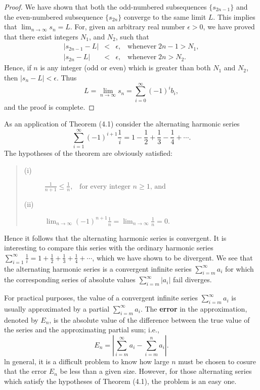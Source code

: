 \begin{proof}
We have shown that both the odd-numbered subsequences $\{s_{2n-1} \}$ and the even-numbered subsequence $\{ s_{2n} \}$ converge to the same limit $L$. This implies that $\lim_{n \rightarrow \infty} s_n = L$. For, given an arbitrary real number $ \epsilon > 0$, we have proved that there exist integers $N_1$, and $N_2$, such that
\begin{eqnarray*}
|s_{2n-1} - L| &<& \epsilon, \;\;\;\mbox{whenever}\; 2n - 1 > N_1, \\
|s_{2n} -L| &<& \epsilon,     \;\;\;\mbox{whenever}\; 2n > N_2. 
\end{eqnarray*}
Hence, if $n$ is any integer (odd or even) which is greater than both $N_1$ and $N_2$, then $|s_n - L| < \epsilon$. Thus
$$
L = \lim_{n \rightarrow \infty} s_n = \sum_{i=0}^\infty (-1)^{i} b_i,
$$
and the proof is complete.
\end{proof}

As an application of Theorem (4.1) consider the alternating harmonic series
$$
\sum_{ i=1}^\infty (-1)^{i + 1} \frac{1}{i} = 1 - \frac{1}{2} + \frac{1}{3} - \frac{1}{4} + \cdots .
$$
\noindent The hypotheses of the theorem are obviously satisfied:
 
\begin{quote}
\begin{description}
\item[(i)] $\frac{1}{n + 1} \leq \frac{1}{n}, \;\;\; \mbox{for every integer $n \geq 1$, and}$ 
\item[(ii)] $\lim_{n \rightarrow \infty} (-1)^{n+1} \frac{1}{n} = \lim_{n \rightarrow \infty} \frac{1}{n} = 0.$ 

\end{description}
\end{quote}
 
Hence it follows that the alternating harmonic series is convergent. It is interesting to compare this series with the ordinary harmonic series
$ \sum_{i=1}^\infty \frac{1}{i} = 1 + \frac{1}{2} + \frac{1}{3} +\frac{1}{4} + \cdots $, which we have shown to be divergent. We see that the alternating harmonic series is a convergent infinite series $\sum_{i=m}^{\infty} a_i$ for which the corresponding series of absolute values $\sum_{i=m}^{\infty} |a_i|$ fail diverges.

For practical purposes, the value of a convergent infinite series $\sum_{i=m}^{\infty}  a_i$ is usually approximated by a partial $\sum_{i=m}^{\infty}  a_i$. The \textbf{error} in the approximation, denoted by $E_n$, is the absolute value of the difference between the true value of the series and the approximating partial sum; i.e.,
$$
E_n = | \sum_{i=m}^{\infty}  a_i - \sum_{i=m}^{n}  a_i | .  
$$
\noindent ln general, it is a difficult problem to know how large $n$ must be chosen to cosure that the error $E_n$ be less than a given size. However, for those alternating series which satisfy the hypotheses of Theorem (4.1), the problem is an easy one.

